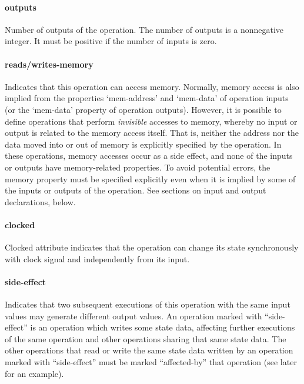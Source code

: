 \documentclass[twoside]{tceusermanual}
\begin{document}
\paragraph{outputs}

Number of outputs of the operation. The number of outputs is a
nonnegative integer. It must be positive if the number of inputs is
zero.

\paragraph{reads/writes-memory}

Indicates that this operation can access memory.  Normally, memory access is
also implied from the properties `mem-address' and `mem-data' of operation
inputs (or the `mem-data' property of operation outputs).  However, it is
possible to define operations that perform \emph{invisible} accesses to
memory, whereby no input or output is related to the memory access itself.
That is, neither the address nor the data moved into or out of memory is
explicitly specified by the operation.  In these operations, memory accesses
occur as a side effect, and none of the inputs or outputs have
memory-related properties.  To avoid potential errors, the memory property
must be specified explicitly even when it is implied by some of the inputs
or outputs of the operation.  See sections on input and output declarations,
below.

\paragraph{clocked}
Clocked attribute indicates that the operation can change its state
synchronously with clock signal and independently from its input.

\paragraph{side-effect}

Indicates that two subsequent executions of this operation with the same
input values may generate different output values.  An operation marked with
``side-effect'' is an operation which writes some state data, affecting
further executions of the same operation and other operations sharing
that same state data. The other operations that read or write
the same state data written by an operation marked with ``side-effect'' 
must be marked ``affected-by'' that operation (see later for an example).
\end{document}
